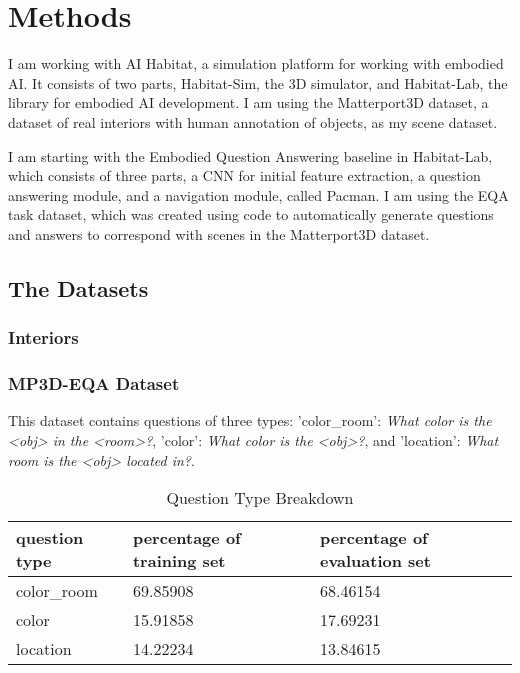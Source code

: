 \chapter{Methods}
I am working with AI Habitat, a simulation platform for working with embodied AI\cite{habitat19iccv}. It consists of two parts, Habitat-Sim, the 3D simulator, and Habitat-Lab, the library for embodied AI development. I am using the Matterport3D dataset, a dataset of real interiors with human annotation of objects, as my scene dataset\cite{matterport}.

I am starting with the Embodied Question Answering baseline in Habitat-Lab, which consists of three parts, a CNN for initial feature extraction, a question answering module, and a navigation module, called Pacman\cite{embodiedqa}. I am using the EQA task dataset, which was created using code to automatically generate questions and answers to correspond with scenes in the Matterport3D dataset\cite{eqa_matterport}. 

\section{The Datasets}
\subsection{Interiors}

\subsection{MP3D-EQA Dataset} 
This dataset contains questions of three types: 'color\_room': \emph{What color is the <obj> in the <room>?}, 'color': \emph{What color is the <obj>?}, and 'location': \emph{What room is the <obj> located in?}. 

\begin{table}[h]
\centering
\caption{Question Type Breakdown}
\begin{tabular}{ |l|l|l| }
\hline
\textbf{question type} & \textbf{percentage of training set} & \textbf{percentage of evaluation set} \\
\hline
color\_room & 69.85908 & 68.46154\\
color & 15.91858 & 17.69231\\
location & 14.22234 & 13.84615\\
\hline
\end{tabular}
\label{tab:q_breakdown}
\end{table}


